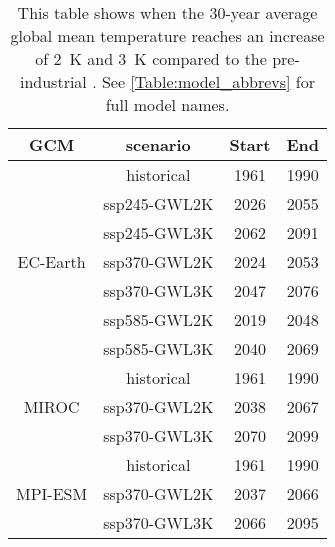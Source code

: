 \begin{table}[!htbp]
\centering
\caption{This table shows when the 30-year average global mean temperature reaches an increase of \qty{2}{\kelvin} and \qty{3}{\kelvin} compared to the pre-industrial  \citep{vautard2014european}. See \autoref{Table:model_abbrevs} for full model names.}
\label{Table:GWL}
\begin{tabular}{|c|c|c|c|}
\toprule
GCM & scenario & Start & End \\
\midrule
\multirow{7}{*}{EC-Earth} & historical & 1961 & 1990\\
 &  ssp245-GWL2K & 2026 & 2055\\
 &  ssp245-GWL3K & 2062 & 2091\\
 &  ssp370-GWL2K & 2024 & 2053\\
 &  ssp370-GWL3K & 2047 & 2076\\
 &  ssp585-GWL2K & 2019 & 2048\\
 &  ssp585-GWL3K & 2040 & 2069\\
\cmidrule(lr){1-4}
\multirow{3}{*}{MIROC} & historical & 1961 & 1990\\
 &  ssp370-GWL2K & 2038 & 2067\\
 &  ssp370-GWL3K & 2070 & 2099\\
\cmidrule(lr){1-4}
\multirow{3}{*}{MPI-ESM} & historical & 1961 & 1990\\
 &  ssp370-GWL2K & 2037 & 2066\\
 &  ssp370-GWL3K & 2066 & 2095\\
\bottomrule
\end{tabular}
\end{table}
